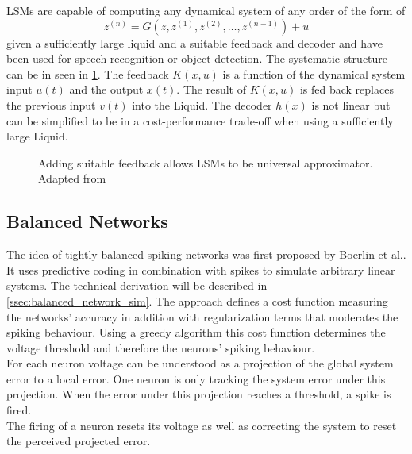 \acp{LSM} are capable of computing any dynamical system of any order of the form of
\begin{equation}
	z^{(n)} = G(z,z^{(1)},z^{(2)},\dots,z^{(n-1)}) + u
\end{equation}
given a sufficiently large liquid and a suitable feedback and decoder\cite{maass_computational_2004} and have been used for speech recognition\cite{jin_performance_2017}\cite{zhang_digital_2015} or object detection\cite{soures_deep_2019}. The systematic structure can be in seen in \cref{fig:LSM_feedback}. The feedback $K(x,u)$ is a function of the dynamical system input $u(t)$ and the output $x(t)$. The result of $K(x,u)$ is fed back replaces the previous input $v(t)$ into the Liquid. The decoder $h(x)$ is not linear but can be simplified to be in a cost-performance trade-off when using a sufficiently large Liquid.\\
\begin{figure}[htbp]
	\centering
	
	\caption{Adding suitable feedback allows \acp{LSM} to be universal approximator. Adapted from \cite{maass_computational_2007}}
	\label{fig:LSM_feedback}
\end{figure}


\subsection{Balanced Networks}
The idea of tightly balanced spiking networks was first proposed by Boerlin et al.\cite{boerlin_predictive_2013}. It uses predictive coding in combination with spikes to simulate arbitrary linear systems.
The technical derivation will be described in \cref{ssec:balanced_network_sim}. The approach defines a cost function measuring the networks' accuracy in addition with regularization terms that moderates the spiking behaviour. Using a greedy algorithm this cost function determines the voltage threshold and therefore the neurons' spiking behaviour.\\
For each neuron voltage can be understood as a projection of the global system error to a local error. One neuron is only tracking the system error under this projection. When the error under this projection reaches a threshold, a spike is fired.\\
The firing of a neuron resets its voltage as well as correcting the system to reset the perceived projected error.\\

